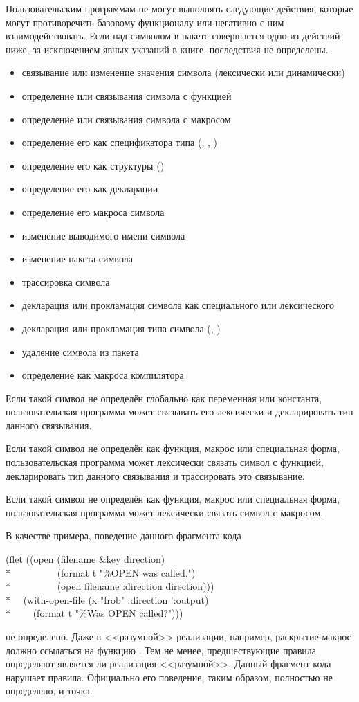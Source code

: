 Пользовательским программам не могут выполнять следующие действия, которые
могут противоречить базовому функционалу или негативно с ним взаимодействовать.
Если над символом в пакете  совершается одно из действий ниже,
за исключением явных указаний в книге, последствия не определены.
\begin{itemize}
\item связывание или изменение значения символа (лексически или динамически)
\item определение или связывания символа с функцией
\item определение или связывания символа с макросом
\item определение его как спецификатора типа (, , )
\item определение его как структуры ()
\item определение его как декларации
\item определение его макроса символа
\item изменение выводимого имени символа
\item изменение пакета символа
\item трассировка символа
\item декларация или прокламация символа как специального или лексического
\item декларация или прокламация типа символа (, )
\item удаление символа из пакета 
\item определение как макроса компилятора
\end{itemize}

Если такой символ не определён глобально как переменная или константа,
пользовательская программа может связывать его лексически и декларировать тип
 данного связывания.

Если такой символ не определён как функция, макрос или специальная форма,
пользовательская программа может лексически связать символ с функцией,
декларировать тип  данного связывания и трассировать это связывание. 

Если такой символ не определён как функция, макрос или специальная форма,
пользовательская программа может лексически связать символ с макросом.

В качестве примера, поведение данного фрагмента кода
\begin{lisp}
(flet ((open (filename \&key direction) \\*
~~~~~~~~~(format t "{\Xtilde}\%OPEN was called.")  \\*
~~~~~~~~~(open filename :direction direction))) \\*
~~(with-open-file (x "frob" :direction ':output)  \\*
~~~~(format t "{\Xtilde}\%Was OPEN called?")))
\end{lisp}
не определено. Даже в <<разумной>> реализации, например, раскрытие макрос
 должно ссылаться на функцию . Тем не менее,
предшествующие правила определяют является ли реализация <<разумной>>.
Данный фрагмент кода нарушает правила. Официально его поведение, таким образом,
полностью не определено, и точка.


